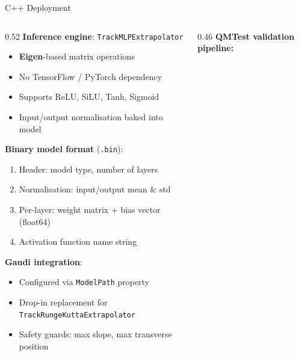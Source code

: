 \documentclass[aspectratio=169, 11pt]{beamer}
\newcommand{\qop}{q/p}
\newcommand{\tx}{t_x}
\newcommand{\ty}{t_y}
\begin{document}
\begin{frame}{C++ Deployment}

\begin{columns}[T]
\begin{column}{0.52\textwidth}
  \textbf{Inference engine}: \texttt{TrackMLPExtrapolator}
  \begin{itemize}\small
    \item \textbf{Eigen}-based matrix operations
    \item No TensorFlow / PyTorch dependency
    \item Supports ReLU, SiLU, Tanh, Sigmoid
    \item Input/output normalisation baked into model
  \end{itemize}

  \vspace{6pt}
  \textbf{Binary model format} (\texttt{.bin}):
  \begin{enumerate}\scriptsize
    \item Header: model type, number of layers
    \item Normalisation: input/output mean \& std
    \item Per-layer: weight matrix + bias vector (float64)
    \item Activation function name string
  \end{enumerate}

  \vspace{6pt}
  \textbf{Gaudi integration}:
  \begin{itemize}\small
    \item Configured via \texttt{ModelPath} property
    \item Drop-in replacement for \texttt{TrackRungeKuttaExtrapolator}
    \item Safety guards: max slope, max transverse position
  \end{itemize}
\end{column}

\begin{column}{0.46\textwidth}
  \textbf{QMTest validation pipeline:}

  \vspace{4pt}
\end{column}
\end{columns}
\end{frame}
\end{document}
